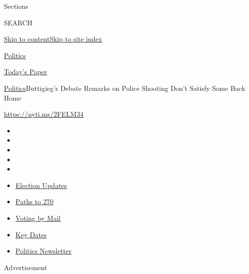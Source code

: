 Sections

SEARCH

\protect\hyperlink{site-content}{Skip to
content}\protect\hyperlink{site-index}{Skip to site index}

\href{https://www.nytimes3xbfgragh.onion/section/politics}{Politics}

\href{https://myaccount.nytimes3xbfgragh.onion/auth/login?response_type=cookie\&client_id=vi}{}

\href{https://www.nytimes3xbfgragh.onion/section/todayspaper}{Today's
Paper}

\href{/section/politics}{Politics}\textbar{}Buttigieg's Debate Remarks
on Police Shooting Don't Satisfy Some Back Home

\url{https://nyti.ms/2FELM34}

\begin{itemize}
\item
\item
\item
\item
\item
\end{itemize}

\begin{itemize}
\item
  \href{https://www.nytimes3xbfgragh.onion/live/2020/09/08/us/trump-vs-biden?action=click\&pgtype=Article\&state=default\&region=TOP_BANNER\&context=storylines_menu}{Election
  Updates}
\item
  \href{https://www.nytimes3xbfgragh.onion/interactive/2020/us/elections/election-states-biden-trump.html?action=click\&pgtype=Article\&state=default\&region=TOP_BANNER\&context=storylines_menu}{Paths
  to 270}
\item
  \href{https://www.nytimes3xbfgragh.onion/interactive/2020/08/31/us/politics/vote-by-mail-deadlines.html?action=click\&pgtype=Article\&state=default\&region=TOP_BANNER\&context=storylines_menu}{Voting
  by Mail}
\item
  \href{https://www.nytimes3xbfgragh.onion/interactive/2019/us/elections/2020-presidential-election-calendar.html?action=click\&pgtype=Article\&state=default\&region=TOP_BANNER\&context=storylines_menu}{Key
  Dates}
\item
  \href{https://www.nytimes3xbfgragh.onion/newsletters/politics?action=click\&pgtype=Article\&state=default\&region=TOP_BANNER\&context=storylines_menu}{Politics
  Newsletter}
\end{itemize}

Advertisement

